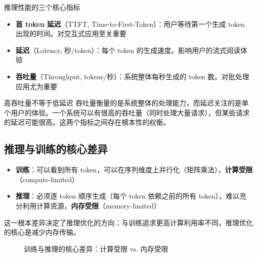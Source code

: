 \begin{importantbox}{推理性能的三个核心指标}
\begin{itemize}
    \item \textbf{首 token 延迟}（TTFT, Time-to-First-Token）：用户等待第一个生成 token 出现的时间。对交互式应用至关重要
    \item \textbf{延迟}（Latency, 秒/token）：每个 token 的生成速度。影响用户的流式阅读体验
    \item \textbf{吞吐量}（Throughput, tokens/秒）：系统整体每秒生成的 token 数。对批处理应用尤为重要
\end{itemize}
\end{importantbox}

\begin{warningbox}{高吞吐量不等于低延迟}
吞吐量衡量的是系统整体的处理能力，而延迟关注的是单个用户的体验。一个系统可以有很高的吞吐量（同时处理大量请求），但某些请求的延迟可能很高。这两个指标之间存在根本性的权衡。
\end{warningbox}

\subsection{推理与训练的核心差异}

\begin{itemize}
    \item \textbf{训练}：可以看到所有 token，可以在序列维度上并行化（矩阵乘法），\textbf{计算受限}（compute-limited）
    \item \textbf{推理}：必须逐 token 顺序生成（每个 token 依赖之前的所有 token），难以充分利用计算资源，\textbf{内存受限}（memory-limited）
\end{itemize}

这一根本差异决定了推理优化的方向：与训练追求更高计算利用率不同，推理优化的核心是减少内存传输。

\begin{figure}[H]
\centering
{}
\caption{训练与推理的核心差异：计算受限 vs. 内存受限}
\end{figure}

